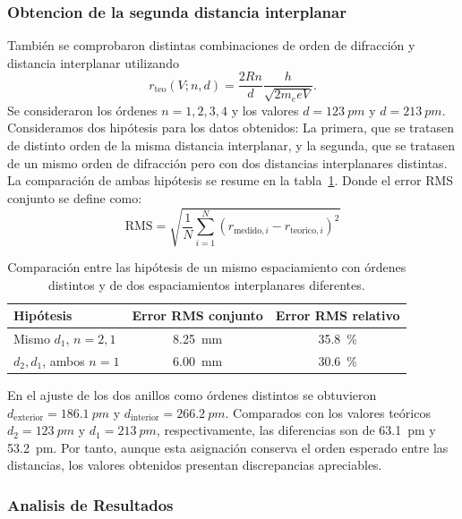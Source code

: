 \documentclass[a4paper,11pt]{article}
\begin{document}
\subsubsection{Obtencion de la segunda distancia interplanar}
También se comprobaron distintas combinaciones de orden de difracción y
distancia interplanar utilizando
\begin{equation}
    r_{\mathrm{teo}}(V;n,d)=
    \frac{2Rn}{d}\frac{h}{\sqrt{2m_e eV}}.
\end{equation}
Se consideraron los órdenes \(n=1,2,3,4\) y los valores
\(d=\SI{123}{pm}\) y \(d=\SI{213}{pm}\). 
Consideramos dos hipótesis para los datos obtenidos: La primera, que se tratasen de distinto orden de la misma distancia interplanar, 
y la segunda, que se tratasen de un mismo orden de difracción pero con dos distancias interplanares distintas.
La comparación de ambas hipótesis se resume en la tabla~\ref{tab:hypotheses}. Donde el error RMS conjunto se define como:
\begin{equation}
    \text{RMS}=\sqrt{\frac{1}{N}\sum_{i=1}^{N}(r_{\text{medido},i}-r_{\text{teorico},i})^2}
\end{equation}

\begin{table}[H]
    \centering
    \caption{Comparación entre las hipótesis de un mismo espaciamiento con
    órdenes distintos y de dos espaciamientos interplanares diferentes.}
    \label{tab:hypotheses}
    \begin{tabular}{lcc}
        \toprule
        Hipótesis & Error RMS conjunto & Error RMS relativo \\
        \midrule
        Mismo \(d_1\), \(n=2,1\) & \SI{8.25}{mm} & \SI{35.8}{\percent} \\
        \(d_2,d_1\), ambos \(n=1\) & \SI{6.00}{mm} & \SI{30.6}{\percent} \\
        \bottomrule
    \end{tabular}
\end{table}
En el ajuste de los dos anillos como órdenes distintos se obtuvieron
\(d_{\text{exterior}}=\SI{186.1}{pm}\) y
\(d_{\text{interior}}=\SI{266.2}{pm}\).
 Comparados con los valores teóricos
\(d_2=\SI{123}{pm}\) y \(d_1=\SI{213}{pm}\), respectivamente, las
diferencias son de \SI{63.1}{pm} y \SI{53.2}{pm}. Por tanto, aunque esta
asignación conserva el orden esperado entre las distancias, los valores
obtenidos presentan discrepancias apreciables.

\subsubsection{Analisis de Resultados}
\end{document}
